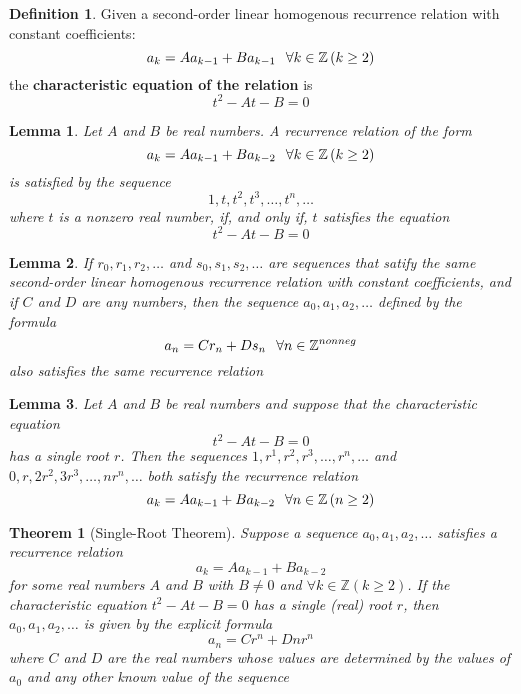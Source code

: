 \documentclass{article}
\theoremstyle{definition}
\newtheorem{definition}{Definition}
\theoremstyle{remark}
\theoremstyle{plain}
\newtheorem{theorem}{Theorem}
\newtheorem{lemma}{Lemma}
\begin{document}
\begin{definition}
  Given a second-order linear homogenous recurrence relation with constant coefficients:
  \[
    a_k = Aa_{k-1} + Ba_{k-1} \hspace{0.1in} \forall k \in \mathbb{Z}\left(k \geq 2\right)
  \] 
  the \textbf{characteristic equation of the relation} is 
  \[
    t^2 - At - B = 0
  \]
\end{definition}

\begin{lemma}
  Let $A$ and $B$ be real numbers. A recurrence relation of the form 
  \[ a_k = Aa_{k-1} + Ba_{k-2} \hspace{0.1in} \forall k \in \mathbb{Z}\left(k\geq 2\right)\] 
  is satisfied by the sequence 
  \[ 1, t, t^2, t^3, \ldots, t^n, \ldots \] 
  where $t$ is a nonzero real number, if, and only if, $t$ satisfies the equation 
  \[ t^2 - At - B = 0 \]
\end{lemma}
\begin{lemma}
  If $r_0, r_1, r_2, \ldots$ and $s_0, s_1, s_2, \ldots$ are sequences that satify the same second-order linear homogenous recurrence relation with constant coefficients, and if $C$ and $D$ are \emph{any} numbers, then the sequence $a_0, a_1, a_2, \ldots$ defined by the formula 
  \[
    a_n = Cr_n + Ds_n \hspace{0.1in} \forall n \in \mathbb{Z}^{nonneg}
  \]
  also satisfies the same recurrence relation
\end{lemma}

\begin{lemma}
  Let $A$ and $B$ be real numbers and suppose that the characteristic equation 
  \[
   t^2 - At - B = 0 
  \]
  has a single root $r$. Then the sequences $1, r^1, r^2, r^3, \ldots, r^n, \ldots$ and $0, r, 2r^2, 3r^3, \ldots, nr^n, \ldots$ both satisfy the recurrence relation 
  \[
    a_k = Aa_{k-1} + Ba_{k-2} \hspace{0.1in} \forall n \in \mathbb{Z}\left(n \geq 2\right)
  \]
\end{lemma}

\begin{theorem}[Single-Root Theorem]
  Suppose a sequence $a_0, a_1, a_2, \ldots$ satisfies a recurrence relation 
  \[a_k = Aa_{k-1} + Ba_{k-2}\] 
  for some real numbers $A$ and $B$ with $B \neq 0$ and $\forall k \in \mathbb{Z}\left(k \geq 2\right)$. If the characteristic equation $t^2 - At - B = 0$ has a single (real) root $r$, then $a_0, a_1, a_2, \ldots$ is given by the explicit formula 
  \[a_n = Cr^{n} + Dnr^{n}\]
  where $C$ and $D$ are the real numbers whose values are determined by the values of $a_0$ and any other known value of the sequence
\end{theorem}
\end{document}
